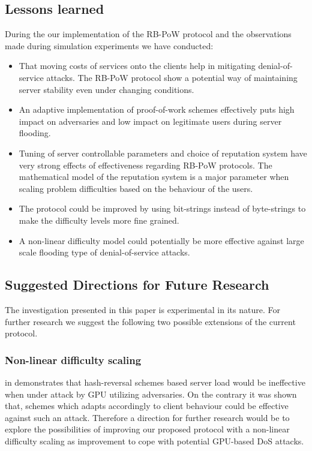 \subsection{Lessons learned}
During the our implementation of the RB-PoW protocol and the observations made during simulation experiments we have conducted:
\begin{itemize}
\item That moving costs of services onto the clients help in mitigating denial-of-service attacks. The RB-PoW protocol show a potential way of maintaining server stability even under changing conditions.

\item An adaptive implementation of proof-of-work schemes effectively puts high impact on adversaries and low impact on legitimate users during server flooding.

\item Tuning of server controllable parameters and choice of reputation system have very strong effects of effectiveness regarding RB-PoW protocols. The mathematical model of the reputation system is a major parameter when scaling problem difficulties based on the behaviour of the users.

\item The protocol could be improved by using bit-strings instead of byte-strings to make the difficulty levels more fine grained. 

\item A non-linear difficulty model could potentially be more effective against large scale flooding type of denial-of-service attacks.

\end{itemize}
\subsection{Suggested Directions for Future Research}
The investigation presented in this paper is experimental in its nature. For further research we suggest the following two possible extensions of the current protocol.

\subsubsection{Non-linear difficulty scaling}
 \citeauthor{Green} in  demonstrates that hash-reversal schemes based server load would be ineffective when under attack by GPU utilizing adversaries. On the contrary it was shown that, schemes which adapts accordingly to client behaviour could be effective against such an attack. Therefore a direction for further research would be to explore the possibilities of improving our proposed protocol with a non-linear difficulty scaling as improvement to cope with potential GPU-based DoS attacks. 

